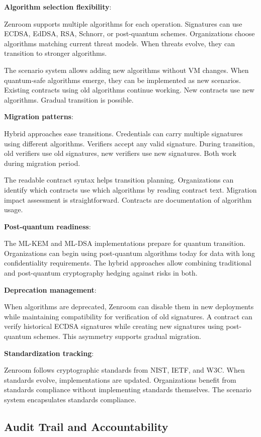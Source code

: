 \textbf{Algorithm selection flexibility}:

Zenroom supports multiple algorithms for each operation. Signatures
can use ECDSA, EdDSA, RSA, Schnorr, or post-quantum
schemes. Organizations choose algorithms matching current threat
models. When threats evolve, they can transition to stronger
algorithms.

The scenario system allows adding new algorithms without VM
changes. When quantum-safe algorithms emerge, they can be implemented
as new scenarios. Existing contracts using old algorithms continue
working. New contracts use new algorithms. Gradual transition is
possible.

\textbf{Migration patterns}:

Hybrid approaches ease transitions. Credentials can carry multiple
signatures using different algorithms. Verifiers accept any valid
signature. During transition, old verifiers use old signatures, new
verifiers use new signatures. Both work during migration period.

The readable contract syntax helps transition planning. Organizations
can identify which contracts use which algorithms by reading contract
text. Migration impact assessment is straightforward. Contracts are
documentation of algorithm usage.

\textbf{Post-quantum readiness}:

The ML-KEM and ML-DSA implementations prepare for quantum
transition. Organizations can begin using post-quantum algorithms
today for data with long confidentiality requirements. The hybrid
approaches allow combining traditional and post-quantum cryptography
hedging against risks in both.

\textbf{Deprecation management}:

When algorithms are deprecated, Zenroom can disable them in new
deployments while maintaining compatibility for verification of old
signatures. A contract can verify historical ECDSA signatures while
creating new signatures using post-quantum schemes. This asymmetry
supports gradual migration.

\textbf{Standardization tracking}:

Zenroom follows cryptographic standards from NIST, IETF, and W3C. When
standards evolve, implementations are updated. Organizations benefit
from standards compliance without implementing standards
themselves. The scenario system encapsulates standards compliance.

\subsection{Audit Trail and Accountability}

